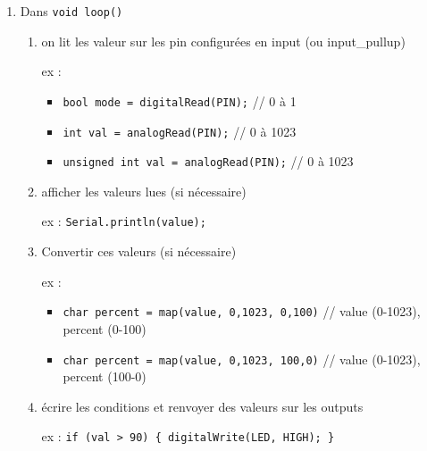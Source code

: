 \documentclass[a4paper]{article}
\begin{document}
\begin{enumerate}
\begin{enumerate}
    \item Dans \texttt{void loop()}
    \begin{enumerate}
        \item on lit les valeur sur les pin configurées en input (ou input\_pullup)
        \begin{example}
            ex :
            \begin{itemize}
                \item \texttt{bool mode = digitalRead(PIN);} // 0 à 1
                \item \texttt{int val = analogRead(PIN);} // 0 à 1023
                \item \texttt{unsigned int val = analogRead(PIN);} // 0 à 1023
            \end{itemize}
        \end{example}
        \item afficher les valeurs lues (si nécessaire)
        \begin{example}
            ex : \texttt{Serial.println(value);}
        \end{example}
        \item Convertir ces valeurs (si nécessaire)
        \begin{example}
            ex :
            \begin{itemize}
                \item \texttt{char percent = map(value, 0,1023, 0,100)} // value (0-1023), percent (0-100)
                \item \texttt{char percent = map(value, 0,1023, 100,0)} // value (0-1023), percent (100-0)
            \end{itemize}
        \end{example}
        \item écrire les conditions et renvoyer des valeurs sur les outputs
        \begin{example}
            ex : \texttt{if (val > 90) \{ digitalWrite(LED, HIGH); \}}
        \end{example}
    \end{enumerate}


\end{enumerate}
\end{enumerate}
\end{document}
